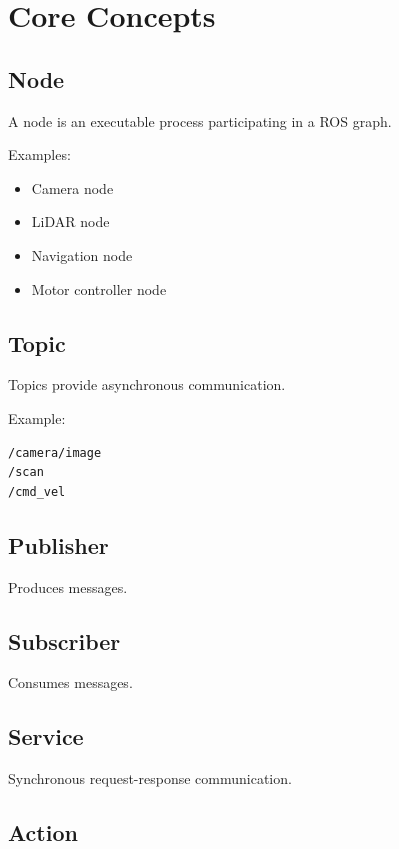 \documentclass[11pt]{article}
\begin{document}
\section{Core Concepts}

\subsection{Node}

A node is an executable process participating in a ROS graph.

Examples:

\begin{itemize}
\item Camera node
\item LiDAR node
\item Navigation node
\item Motor controller node
\end{itemize}

\subsection{Topic}

Topics provide asynchronous communication.

Example:

\begin{verbatim}
/camera/image
/scan
/cmd_vel
\end{verbatim}

\subsection{Publisher}

Produces messages.

\subsection{Subscriber}

Consumes messages.

\subsection{Service}

Synchronous request-response communication.

\subsection{Action}
\end{document}
